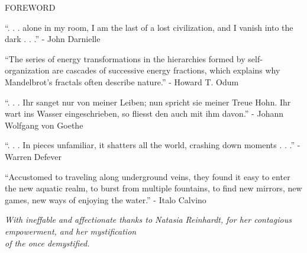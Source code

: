 \documentclass[12pt]{article}
\begin{document}
\begingroup
\begin{center}
\huge FOREWORD
\end{center}
\endgroup

\vspace*{2\baselineskip}

\begingroup
\begin{center}
``. . . alone in my room, I am the last of a lost civilization, and I vanish into the dark . . .''
\rightskip\leftskip
\phantom{text} \hfill - John Darnielle
\end{center}
\endgroup

\vspace*{2\baselineskip}

\begingroup
\begin{center}
``The series of energy transformations in the hierarchies formed by self-organization are cascades of successive energy fractions, which explains why Mandelbrot's fractals often describe nature.''
\rightskip\leftskip
\phantom{text} \hfill - Howard T. Odum
\end{center}
\endgroup

\vspace*{2\baselineskip}

\begingroup
\begin{center}
``. . . Ihr sanget nur von meiner Leiben; nun spricht sie meiner Treue Hohn. Ihr wart ins Wasser eingeschrieben, so fliesst den auch mit ihm davon.''
\rightskip\leftskip
\phantom{text} \hfill - Johann Wolfgang von Goethe
\end{center}
\endgroup

\vspace*{2\baselineskip}

\begingroup
\begin{center}
``. . . In pieces unfamiliar, it shatters all the world, crashing down moments . . .''
\rightskip\leftskip
\phantom{text} \hfill - Warren Defever
\end{center}
\endgroup

\vspace*{2\baselineskip}

\begingroup
\begin{center}
``Accustomed to traveling along underground veins, they found it easy to enter the new aquatic realm, to burst from multiple fountains, to find new mirrors, new games, new ways of enjoying the water.''
\rightskip\leftskip
\phantom{text} \hfill - Italo Calvino
\end{center}
\endgroup

\vspace*{12\baselineskip}

\begingroup
\begin{center}
\textit{With ineffable and affectionate thanks to Natasia Reinhardt, for her contagious empowerment, and her mystification \\ of the once demystified.}
\end{center}
\endgroup
\end{document}
